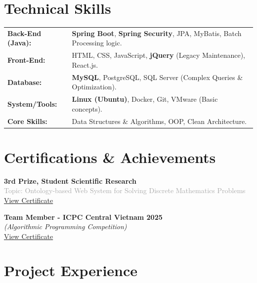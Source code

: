 \documentclass[10pt,a4paper]{article}
\begin{document}
\section{Technical Skills}
\begin{tabularx}{\textwidth}{@{}l X@{}}
    \textbf{Back-End (Java):} & \textbf{Spring Boot}, \textbf{Spring Security}, JPA, MyBatis, Batch Processing logic. \\
    \textbf{Front-End:} & HTML, CSS, JavaScript, \textbf{jQuery} (Legacy Maintenance), React.js. \\
    \textbf{Database:} & \textbf{MySQL}, PostgreSQL, SQL Server (Complex Queries \& Optimization). \\
    \textbf{System/Tools:} & \textbf{Linux (Ubuntu)}, Docker, Git, VMware (Basic concepts). \\
    \textbf{Core Skills:} & Data Structures \& Algorithms, OOP, Clean Architecture. \\
\end{tabularx}

\section{Certifications \& Achievements}
\begin{minipage}[t]{0.65\textwidth}
    \textbf{\small 3rd Prize, Student Scientific Research}\\[1pt]
    \textcolor{darkgray}{\scriptsize Topic: Ontology-based Web System for Solving Discrete Mathematics Problems} \\
    \href{https://github.com/dungken/MyResume/blob/master/Certificates/nckh.png}{\textcolor{secondary}{\scriptsize \faExternalLink* View Certificate}}
\end{minipage}%
\begin{minipage}[t]{0.35\textwidth}
    \textbf{\small Team Member - ICPC Central Vietnam 2025}\\[1pt]
    \textit{\scriptsize (Algorithmic Programming Competition)} \\
    \href{https://github.com/dungken/MyResume/blob/master/Certificates/icpc.png}{\textcolor{secondary}{\scriptsize \faExternalLink* View Certificate}}
\end{minipage}

\section{Project Experience}
\end{document}
